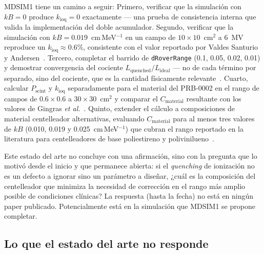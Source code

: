 \documentclass[11pt,a4paper]{article}
\begin{document}
MDSIM1 tiene un camino a seguir: Primero, verificar que la simulación con $kB = 0$ produce $k_{\mathrm{ioq}} = 0$ exactamente --- una prueba de consistencia interna que valida la implementación del doble acumulador. Segundo, verificar que la simulación con $kB = 0{.}019$~cm\,MeV$^{-1}$ en un campo de $10 \times 10$~cm$^{2}$ a 6~MV reproduce un $k_{\mathrm{ioq}} \approx 0{.}6$\%, consistente con el valor reportado por Valdes Santurio y Andersen~\cite{santurio2019}. Tercero, completar el barrido de \texttt{dRoverRange} (0.1, 0.05, 0.02, 0.01) y demostrar convergencia del cociente $L_{\mathrm{quenched}}/L_{\mathrm{ideal}}$ --- no de cada término por separado, sino del cociente, que es la cantidad físicamente relevante~\cite{ebenau2016}. Cuarto, calcular $P_{\mathrm{scint}}$ y $k_{\mathrm{ioq}}$ separadamente para el material del PRB-0002 en el rango de campos de $0{.}6 \times 0{.}6$ a $30 \times 30$~cm$^{2}$ y comparar el $C_{\mathrm{material}}$ resultante con los valores de Gingras \textit{et al.}~\cite{gingras2025}. Quinto, extender el cálculo a composiciones de material centelleador alternativas, evaluando $C_{\mathrm{material}}$ para al menos tres valores de $kB$ (0.010, 0.019 y 0.025~cm\,MeV$^{-1}$) que cubran el rango reportado en la literatura para centelleadores de base poliestireno y polivinilueno~\cite{boivin2016,poeschl2020}.

Este estado del arte no concluye con una afirmación, sino con la pregunta que lo motivó desde el inicio y que permanece abierta: si el \textit{quenching} de ionización no es un defecto a ignorar sino un parámetro a diseñar, ¿cuál es la composición del centelleador que minimiza la necesidad de corrección en el rango más amplio posible de condiciones clínicas? La respuesta (hasta la fecha) no está en ningún paper publicado. Potencialmente está en la simulación que MDSIM1 se propone completar.

\subsection*{Lo que el estado del arte no responde}



\end{document}
